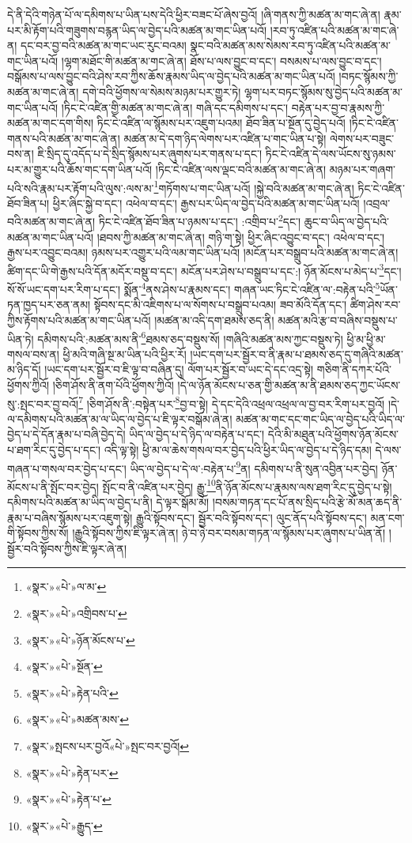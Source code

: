 དེ་ནི་དེའི་གཉེན་པོ་ལ་དམིགས་པ་ཡིན་པས་དེའི་ཕྱིར་བཟང་པོ་ཞེས་བྱའོ། །ཞི་གནས་ཀྱི་མཚན་མ་གང་ཞེ་ན། རྣམ་པར་མི་རྟོག་པའི་གཟུགས་བརྙན་ཡིད་ལ་བྱེད་པའི་མཚན་མ་གང་ཡིན་པའོ། །རབ་ཏུ་འཛིན་པའི་མཚན་མ་གང་ཞེ་ན། དང་བར་བྱ་བའི་མཚན་མ་གང་ཡང་རུང་བའམ། སྣང་བའི་མཚན་མས་སེམས་རབ་ཏུ་འཛིན་པའི་མཚན་མ་གང་ཡིན་པའོ། །ལྷག་མཐོང་གི་མཚན་མ་གང་ཞེ་ན། ཐོས་པ་ལས་བྱུང་བ་དང་། བསམས་པ་ལས་བྱུང་བ་དང་། བསྒོམས་པ་ལས་བྱུང་བའི་ཤེས་རབ་ཀྱིས་ཆོས་རྣམས་ཡིད་ལ་བྱེད་པའི་མཚན་མ་གང་ཡིན་པའོ། །བཏང་སྙོམས་ཀྱི་མཚན་མ་གང་ཞེ་ན། དགེ་བའི་ཕྱོགས་ལ་སེམས་མཉམ་པར་གྱུར་ཏེ། ལྷག་པར་བཏང་སྙོམས་སུ་བྱེད་པའི་མཚན་མ་གང་ཡིན་པའོ། །ཏིང་ངེ་འཛིན་གྱི་མཚན་མ་གང་ཞེ་ན། གཞི་དང་དམིགས་པ་དང་། བརྟེན་པར་བྱ་བ་རྣམས་ཀྱི་མཚན་མ་གང་དག་གིས། ཏིང་ངེ་འཛིན་ལ་སྙོམས་པར་འཇུག་པའམ། ཐོབ་ཟིན་པ་སྔོན་དུ་བྱེད་པའོ། །ཏིང་ངེ་འཛིན་གནས་པའི་མཚན་མ་གང་ཞེ་ན། མཚན་མ་དེ་དག་ཉིད་ལེགས་པར་འཛིན་པ་གང་ཡིན་པ་སྟེ། ལེགས་པར་བཟུང་བས་ན། ཇི་སྲིད་དུ་འདོད་པ་དེ་སྲིད་སྙོམས་པར་ཞུགས་པར་གནས་པ་དང་། ཏིང་ངེ་འཛིན་དེ་ལས་ཡོངས་སུ་ཉམས་པར་མ་གྱུར་པའི་ཆོས་གང་དག་ཡིན་པའོ། །ཏིང་ངེ་འཛིན་ལས་ལྡང་བའི་མཚན་མ་གང་ཞེ་ན། མཉམ་པར་གཞག་པའི་སའི་རྣམ་པར་རྟོག་པའི་ལུས་:ལས་མ་\footnote{«སྣར་»«པེ་»ལ་མ་}གཏོགས་པ་གང་ཡིན་པའོ། །སྐྱེ་བའི་མཚན་མ་གང་ཞེ་ན། ཏིང་ངེ་འཛིན་ཐོབ་ཟིན་པ། ཕྱིར་ཞིང་སྐྱེ་བ་དང་། འཕེལ་བ་དང་། རྒྱས་པར་ཡིད་ལ་བྱེད་པའི་མཚན་མ་གང་ཡིན་པའོ། །འབྲལ་བའི་མཚན་མ་གང་ཞེ་ན། ཏིང་ངེ་འཛིན་ཐོབ་ཟིན་པ་ཉམས་པ་དང་། :འགྲིབ་པ་\footnote{«སྣར་»«པེ་»འགྲིབས་པ་}དང་། ཆུང་བ་ཡིད་ལ་བྱེད་པའི་མཚན་མ་གང་ཡིན་པའོ། །ཐབས་ཀྱི་མཚན་མ་གང་ཞེ་ན། གཉི་ག་སྟེ། ཕྱིར་ཞིང་འབྱུང་བ་དང་། འཕེལ་བ་དང་། རྒྱས་པར་འབྱུང་བའམ། ཉམས་པར་འགྱུར་པའི་ལམ་གང་ཡིན་པའོ། །མངོན་པར་བསྒྲུབ་པའི་མཚན་མ་གང་ཞེ་ན། ཚིག་དང་ཡི་གེ་རྒྱས་པའི་དོན་མདོར་བསྡུ་བ་དང་། མངོན་པར་ཤེས་པ་བསྒྲུབ་པ་དང་:། ཉོན་མོངས་པ་མེད་པ་\footnote{«སྣར་»«པེ་»ཉོན་མོངས་པ་}དང་། སོ་སོ་ཡང་དག་པར་རིག་པ་དང་། སྨོན་\footnote{«སྣར་»«པེ་»སྔོན་}ནས་ཤེས་པ་རྣམས་དང་། གཞན་ཡང་ཏིང་ངེ་འཛིན་ལ་:བརྟེན་པའི་\footnote{«སྣར་»«པེ་»རྟེན་པའི་}ཡོན་ཏན་ཁྱད་པར་ཅན་ནམ། སྟོབས་དང་མི་འཇིགས་པ་ལ་སོགས་པ་བསྒྲུབ་པའམ། ཟབ་མོའི་དོན་དང་། ཚིག་ཤེས་རབ་ཀྱིས་རྟོགས་པའི་མཚན་མ་གང་ཡིན་པའོ། །མཚན་མ་འདི་དག་ཐམས་ཅད་ནི། མཚན་མའི་རྩ་བ་བཞིས་བསྡུས་པ་ཡིན་ཏེ། དམིགས་པའི་:མཚན་མས་ནི་\footnote{«སྣར་»«པེ་»མཚན་མས་}ཐམས་ཅད་བསྡུས་སོ། །གཞིའི་མཚན་མས་ཀྱང་བསྡུས་ཏེ། ཕྱི་མ་ཕྱི་མ་གསལ་བས་ན། ཕྱི་མའི་གཞི་སྔ་མ་ཡིན་པའི་ཕྱིར་རོ། །ཡང་དག་པར་སྦྱོར་བ་ནི་རྣམ་པ་ཐམས་ཅད་དུ་གཞིའི་མཚན་མ་ཉིད་དོ། །ཡང་དག་པར་སྦྱོར་བ་ཇི་ལྟ་བ་བཞིན་དུ། ལོག་པར་སྦྱོར་བ་ཡང་དེ་དང་འདྲ་སྟེ། གཅིག་ནི་དཀར་པོའི་ཕྱོགས་ཀྱིའོ། །ཅིག་ཤོས་ནི་ནག་པོའི་ཕྱོགས་ཀྱིའོ། །དེ་ལ་ཉོན་མོངས་པ་ཅན་གྱི་མཚན་མ་ནི་ཐམས་ཅད་ཀྱང་ཡོངས་སུ་:སྤང་བར་བྱ་བའོ།\footnote{«སྣར་»སྤངས་པར་བྱའོ«པེ་»སྤང་བར་བྱའོ།} །ཅིག་ཤོས་ནི་:བསྟེན་པར་\footnote{«སྣར་»«པེ་»རྟེན་པར་}བྱ་བ་སྟེ། དེ་དང་དེའི་འཕྲལ་འཕྲལ་ལ་བྱ་བར་རིག་པར་བྱའོ། །དེ་ལ་དམིགས་པའི་མཚན་མ་ལ་ཡིད་ལ་བྱེད་པ་ཇི་ལྟར་བསྒོམ་ཞེ་ན། མཚན་མ་གང་དང་གང་ཡིད་ལ་བྱེད་པའི་ཡིད་ལ་བྱེད་པ་དེ་དོན་རྣམ་པ་བཞི་བྱེད་དེ། ཡིད་ལ་བྱེད་པ་དེ་ཉིད་ལ་བརྟེན་པ་དང་། དེའི་མི་མཐུན་པའི་ཕྱོགས་ཉོན་མོངས་པ་ཐག་རིང་དུ་བྱེད་པ་དང་། འདི་ལྟ་སྟེ། ཕྱི་མ་ལ་ཆེས་གསལ་བར་བྱེད་པའི་ཕྱིར་ཡིད་ལ་བྱེད་པ་དེ་ཉིད་དམ། དེ་ལས་གཞན་པ་གསལ་བར་བྱེད་པ་དང་། ཡིད་ལ་བྱེད་པ་དེ་ལ་:བརྟེན་པ་\footnote{«སྣར་»«པེ་»རྟེན་པ་}ན། དམིགས་པ་ནི་སུན་འབྱིན་པར་བྱེད། ཉོན་མོངས་པ་ནི་སྤོང་བར་བྱེད། སྤོང་བ་ནི་འཛིན་པར་བྱེད། རྒྱུ་\footnote{«སྣར་»«པེ་»རྒྱུད་}ནི་ཉོན་མོངས་པ་རྣམས་ལས་ཐག་རིང་དུ་བྱེད་པ་སྟེ། དམིགས་པའི་མཚན་མ་ཡིད་ལ་བྱེད་པ་ནི། དེ་ལྟར་སྒོམ་མོ། །བསམ་གཏན་དང་པོ་ནས་སྲིད་པའི་རྩེ་མོ་མན་ཆད་ནི་རྣམ་པ་བཞིས་སྙོམས་པར་འཇུག་སྟེ། རྒྱུའི་སྟོབས་དང་། སྦྱོར་བའི་སྟོབས་དང་། ལུང་ནོད་པའི་སྟོབས་དང་། མན་ངག་གི་སྟོབས་ཀྱིས་སོ། །རྒྱུའི་སྟོབས་ཀྱིས་ཇི་ལྟར་ཞེ་ན། ཉེ་བ་ཉེ་བར་བསམ་གཏན་ལ་སྙོམས་པར་ཞུགས་པ་ཡིན་ནོ། །སྦྱོར་བའི་སྟོབས་ཀྱིས་ཇི་ལྟར་ཞེ་ན། 